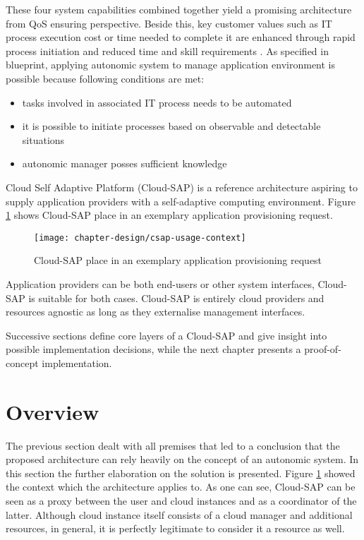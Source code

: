 These four system capabilities combined together yield a promising architecture from QoS ensuring perspective. Beside this, key customer values such as IT process execution cost or time needed to complete it are enhanced through rapid process initiation and reduced time and skill requirements \cite{IBM06}. As specified in blueprint, applying autonomic system to manage application environment is possible because following conditions are met:
\begin{itemize}
  \item tasks involved in associated IT process needs to be automated
  \item it is possible to initiate processes based on observable and detectable situations
  \item autonomic manager posses sufficient knowledge
\end{itemize}

Cloud Self Adaptive Platform (Cloud-SAP) is a reference architecture aspiring to supply application providers with a self-adaptive computing environment. Figure \ref{img:csap-usage-context} shows Cloud-SAP place in an exemplary application provisioning request. 
\begin{figure}[!ht]
  \begin{center}
    \texttt{[image: chapter-design/csap-usage-context]}
  \end{center}
  \caption{Cloud-SAP place in an exemplary application provisioning request}
  \label{img:csap-usage-context}
\end{figure}

Application providers can be both end-users or other system interfaces, Cloud-SAP is suitable for both cases. Cloud-SAP is entirely cloud providers and resources agnostic as long as they externalise management interfaces.

Successive sections define core layers of a Cloud-SAP and give insight into possible implementation decisions, while the next chapter presents a proof-of-concept implementation.

\section{Overview}
The previous section dealt with all premises that led to a conclusion that the proposed architecture can rely heavily on the concept of an autonomic system. In this section the further elaboration on the solution is presented.
Figure \ref{img:csap-usage-context} showed the context which the architecture applies to. As one can see, Cloud-SAP can be seen as a proxy between the user and cloud instances and as a coordinator of the latter. Although cloud instance itself consists of a cloud manager and additional resources, in general, it is perfectly legitimate to consider it a resource as well. 

